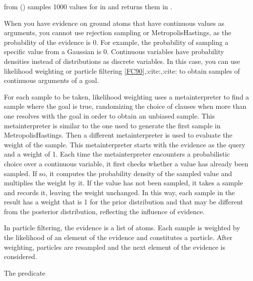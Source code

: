 \documentclass[letterpaper,10pt,english]{sphinxmanual}
\begin{document}
\sphinxAtStartPar
from () samples 1000 values for  in  and returns them in .

\sphinxAtStartPar
When you have evidence on ground atoms that have continuous values as arguments, you cannot use rejection sampling or Metropolis\sphinxhyphen{}Hastings, as the probability of the evidence is 0. For example, the probability of sampling a specific value from a Gaussian is 0.
Continuous variables have probability densities instead of distributions as discrete variables. In this case, you can use likelihood weighting or particle filtering {[}\hyperlink{cite.index:id57}{FC90}{]},:cite:,:cite: to obtain samples of continuous arguments of a goal.

\sphinxAtStartPar
For each sample to be taken, likelihood weighting uses a meta\sphinxhyphen{}interpreter to find a sample where the goal is true, randomizing the choice of clauses when more than one resolves with the goal in order to obtain an unbiased sample.
This meta\sphinxhyphen{}interpreter is similar to the one used to generate the first sample in Metropolis\sphinxhyphen{}Hastings.
Then a different meta\sphinxhyphen{}interpreter is used to evaluate the weight of the sample.
This meta\sphinxhyphen{}interpreter starts with the evidence as the query and a weight of 1.
Each time the meta\sphinxhyphen{}interpreter encounters a probabilistic choice over a continuous variable, it first checks whether a value has already been sampled.
If so, it computes the probability density of the sampled value and multiplies the weight by it.
If the value has not been sampled, it takes a sample and records it, leaving the weight unchanged.
In this way, each sample in the result has a weight that is 1 for the prior distribution and that may be different from the posterior distribution, reflecting the influence of evidence.

\sphinxAtStartPar
In particle filtering, the evidence is a list of atoms. Each sample is weighted by the likelihood of an element of the evidence and constitutes a particle.
After weighting, particles are resampled and the next element of the evidence is considered.

\sphinxAtStartPar
The predicate

\begin{sphinxVerbatim}[commandchars=\\\{\}]
  
\end{sphinxVerbatim}
\end{document}
